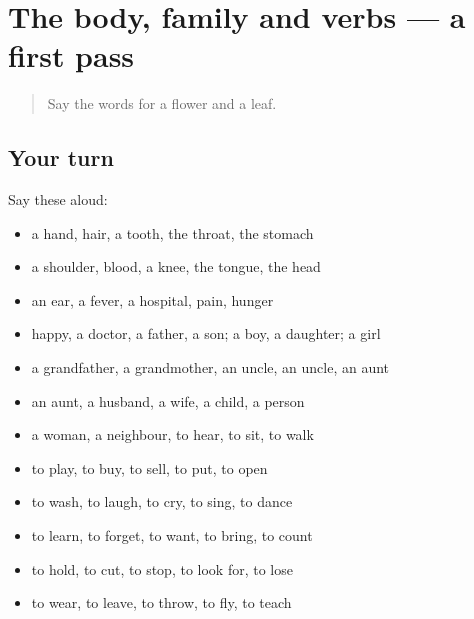 \section[(dialogue)]{The body, family and verbs — a first pass}

\label{lesson:BN-R65-first-pass-the-body-family-and-verbs}



\begin{quote}
Say the words for a flower and a leaf.
\end{quote}

\subsection*{Your turn}
Say these aloud:

\begin{itemize}
\raggedright
  \item a hand, hair, a tooth, the throat, the stomach
  \item a shoulder, blood, a knee, the tongue, the head
  \item an ear, a fever, a hospital, pain, hunger
  \item happy, a doctor, a father, a son; a boy, a daughter; a girl
  \item a grandfather, a grandmother, an uncle, an uncle, an aunt
  \item an aunt, a husband, a wife, a child, a person
  \item a woman, a neighbour, to hear, to sit, to walk
  \item to play, to buy, to sell, to put, to open
  \item to wash, to laugh, to cry, to sing, to dance
  \item to learn, to forget, to want, to bring, to count
  \item to hold, to cut, to stop, to look for, to lose
  \item to wear, to leave, to throw, to fly, to teach
\end{itemize}

